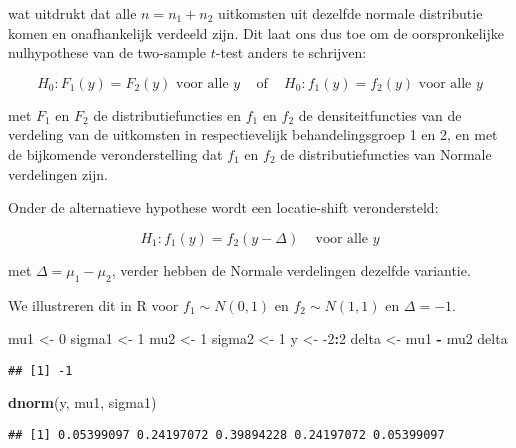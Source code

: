 \documentclass[
  12pt,dutch,coursenotes]{book}
\newenvironment{Shaded}{\begin{snugshade}}{\end{snugshade}}
\newcommand{\DecValTok}[1]{\textcolor[rgb]{0.00,0.00,0.81}{#1}}
\newcommand{\KeywordTok}[1]{\textcolor[rgb]{0.13,0.29,0.53}{\textbf{#1}}}
\newcommand{\NormalTok}[1]{#1}
\newcommand{\OperatorTok}[1]{\textcolor[rgb]{0.81,0.36,0.00}{\textbf{#1}}}
\newcommand{\StringTok}[1]{\textcolor[rgb]{0.31,0.60,0.02}{#1}}
\theoremstyle{definition}
\theoremstyle{definition}
\theoremstyle{definition}
\theoremstyle{remark}
\begin{document}
wat uitdrukt dat alle \(n=n_1+n_2\) uitkomsten uit dezelfde normale distributie komen en onafhankelijk verdeeld zijn. Dit laat ons dus toe om de oorspronkelijke nulhypothese van de two-sample \(t\)-test anders te schrijven:

\begin{equation}
H_0: F_1(y) = F_2(y) \text{ voor alle } y \;\;\;\text{ of }\;\;\; H_0: f_1(y) = f_2(y) \text{ voor alle } y \label{eq:H0F1F2}
\end{equation}

met \(F_1\) en \(F_2\) de distributiefuncties en \(f_1\) en \(f_2\) de densiteitfuncties van de verdeling van de uitkomsten in respectievelijk behandelingsgroep 1 en 2, en met de bijkomende veronderstelling dat \(f_1\) en \(f_2\) de distributiefuncties van Normale verdelingen zijn.

Onder de alternatieve hypothese wordt een locatie-shift verondersteld:

\[H_1: f_1(y)=f_2(y-\Delta) \;\;\;\text{ voor alle } y\]

met \(\Delta=\mu_1-\mu_2\), verder hebben de Normale verdelingen dezelfde variantie.

We illustreren dit in R voor \(f_1\sim N(0,1)\) en \(f_2\sim N(1,1)\) en \(\Delta=-1\).

\begin{Shaded}
\begin{Highlighting}[]
\NormalTok{mu1 \textless{}{-}}\StringTok{ }\DecValTok{0}
\NormalTok{sigma1 \textless{}{-}}\StringTok{ }\DecValTok{1}
\NormalTok{mu2 \textless{}{-}}\StringTok{ }\DecValTok{1}
\NormalTok{sigma2 \textless{}{-}}\StringTok{ }\DecValTok{1}
\NormalTok{y \textless{}{-}}\StringTok{ }\DecValTok{{-}2}\OperatorTok{:}\DecValTok{2}
\NormalTok{delta \textless{}{-}}\StringTok{ }\NormalTok{mu1 }\OperatorTok{{-}}\StringTok{ }\NormalTok{mu2}
\NormalTok{delta}
\end{Highlighting}
\end{Shaded}

\begin{verbatim}
## [1] -1
\end{verbatim}

\begin{Shaded}
\begin{Highlighting}[]
\KeywordTok{dnorm}\NormalTok{(y, mu1, sigma1)}
\end{Highlighting}
\end{Shaded}

\begin{verbatim}
## [1] 0.05399097 0.24197072 0.39894228 0.24197072 0.05399097
\end{verbatim}
\end{document}
